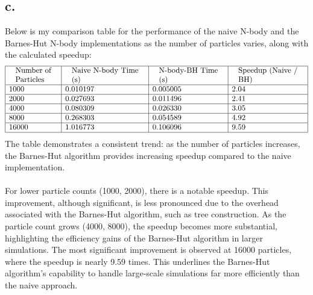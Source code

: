 \documentclass{article}
\begin{document}
\subsection*{c.}
Below is my comparison table for the performance of the naive N-body and the Barnes-Hut N-body implementations as the number of particles varies, along with the calculated speedup:
$$
\begin{array}{|l|l|l|l|}
\hline \begin{array}{l}
\text { Number of } \\
\text { Particles }
\end{array} & \begin{array}{l}
\text { Naive N-body Time } \\
\text { (s) }
\end{array} & \begin{array}{l}
\text { N-body-BH Time } \\
\text { (s) }
\end{array} & \begin{array}{l}
\text { Speedup (Naive / } \\
\text { BH) }
\end{array} \\
\hline 1000 & 0.010197 & 0.005005 & 2.04 \\
\hline 2000 & 0.027693 & 0.011496 & 2.41 \\
\hline 4000 & 0.080309 & 0.026330 & 3.05 \\
\hline 8000 & 0.268303 & 0.054589 & 4.92 \\
\hline 16000 & 1.016773 & 0.106096 & 9.59 \\
\hline
\end{array}
$$
The table demonstrates a consistent trend: as the number of particles increases, the Barnes-Hut algorithm provides increasing speedup compared to the naive implementation.
\\
\\
For lower particle counts (1000, 2000), there is a notable speedup. This improvement, although significant, is less pronounced due to the overhead associated with the Barnes-Hut algorithm, such as tree construction. As the particle count grows (4000, 8000), the speedup becomes more substantial, highlighting the efficiency gains of the Barnes-Hut algorithm in larger simulations. The most significant improvement is observed at 16000 particles, where the speedup is nearly 9.59 times. This underlines the Barnes-Hut algorithm's capability to handle large-scale simulations far more efficiently than the naive approach.
\end{document}
